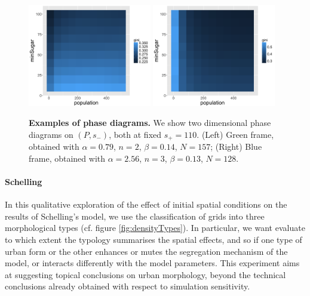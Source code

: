 \documentclass[Royal,sageh,times]{sagej}
\begin{document}
\begin{figure}
\centering
\includegraphics[width=0.48\textwidth]{figures/phasediagram_id27_maxSugar110}
\includegraphics[width=0.48\textwidth]{figures/phasediagram_id0_maxSugar110}
\caption{\textbf{Examples of phase diagrams.} We show two dimensional phase diagrams on $(P,s_-)$, both at fixed $s_+ = 110$. (Left) Green frame, obtained with $\alpha = 0.79$, $n=2$, $\beta = 0.14$, $N=157$; (Right) Blue frame, obtained with $\alpha = 2.56$, $n=3$, $\beta = 0.13$, $N=128$.}
\label{fig:sugarscape-phasediagrams}
\end{figure}




\paragraph{Schelling} In this qualitative exploration of the effect of initial spatial conditions on the results of Schelling's model, we use the classification of grids into three morphological types (cf. figure \ref{fig:densityTypes}). In particular, we want evaluate to which extent the typology summarises the spatial effects, and so if one type of urban form or the other enhances or mutes the segregation mechanism of the model, or interacts differently with the model parameters. This experiment aims at suggesting topical conclusions on urban morphology, beyond the technical conclusions already obtained with respect to simulation sensitivity.
\end{document}
